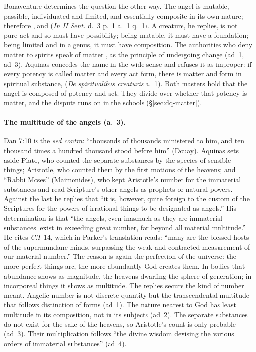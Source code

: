 Bonaventure determines the question the other way. The angel is mutable,
passible, individuated and limited, and essentially composite in its own
nature; therefore , and
 (\emph{In II Sent.} d.~3 p.~1 a.~1 q.~1).
A creature, he replies, is not pure act and so must have possibility;
being mutable, it must have a foundation; being limited and in a genus, it
must have composition. The authorities who deny matter to spirits speak of
matter , as the principle of undergoing change (ad~1,
ad~3). Aquinas concedes the name in the wide sense and refuses it as
improper: if every potency is called matter and every act form, there is
matter and form in spiritual substance,  (\emph{De spiritualibus
creaturis} a.~1). Both masters hold that the angel is composed of potency
and act. They divide over whether that potency is matter, and the
dispute runs on in the schools (\S\ref{sec:dq-matter}).

\paragraph{The multitude of the angels (a.~3).} Dan 7:10 is the \emph{sed
contra}: ``thousands of thousands ministered to him, and ten thousand times
a hundred thousand stood before him'' (Douay). Aquinas sets aside Plato,
who counted the separate substances by the species of sensible things;
Aristotle, who counted them by the first motions of the heavens; and
``Rabbi Moses'' (Maimonides), who kept Aristotle's number for the
immaterial substances and read Scripture's other angels as prophets or
natural powers. Against the last he replies that ``it is, however, quite
foreign to the custom of the Scriptures for the powers of irrational things
to be designated as angels.'' His determination is that ``the angels, even
inasmuch as they are immaterial substances, exist in exceeding great
number, far beyond all material multitude.'' He cites \emph{CH}~14, which
in Parker's translation reads: ``many are the blessed hosts of the
supermundane minds, surpassing the weak and contracted measurement of our
material number.'' The reason is again the perfection of the universe: the
more perfect things are, the more abundantly God creates them. In bodies
that abundance shows as magnitude, the heavens dwarfing the sphere of
generation; in incorporeal things it shows as multitude. The replies secure
the kind of number meant. Angelic number is not discrete quantity but the
transcendental multitude that follows distinction of forms (ad~1). The
nature nearest to God has least multitude in its composition, not in its
subjects (ad~2). The separate substances do not exist for the sake of the
heavens, so Aristotle's count is only probable (ad~3). Their multiplication
follows ``the divine wisdom devising the various orders of immaterial
substances'' (ad~4).

